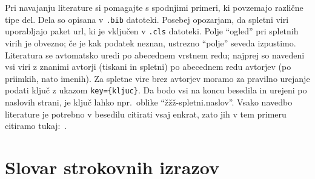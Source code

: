\documentclass[mat1]{fmfdelo}
\begin{document}
Pri navajanju literature si pomagajte s spodnjimi primeri, ki povzemajo različne tipe del. Dela so opisana v \verb|.bib| datoteki.
Posebej opozarjam, da spletni viri uporabljajo paket url, ki je vključen v \verb|.cls| datoteki. Polje ``ogled'' pri spletnih virih je obvezno; če je kak podatek neznan, ustrezno ``polje'' seveda izpustimo. Literatura se avtomatsko uredi po abecednem vrstnem redu; najprej so navedeni vsi viri z znanimi avtorji (tiskani in spletni)  po abecednem redu avtorjev (po priimkih, nato imenih). Za spletne vire brez avtorjev moramo za pravilno urejanje podati ključ z ukazom \verb|key={kljuc}|. Da bodo vsi na koncu besedila in urejeni po naslovih strani, je ključ lahko npr.~oblike ``žžž-spletni.naslov''.
Vsako navedbo literature je potrebno v besedilu citirati vsaj enkrat, zato jih v tem primeru citiramo tukaj:~\cite{angelini2011straight,globevniSkriptaWeb,lang2012fundamentals,lindic2007igra,spletMatrika,penttila2005flocks,spletSample,diplomaSample,conferenceSample,bookSample,clanekSample,velkovrh1974nekaj}.


\section*{Slovar strokovnih izrazov}









\end{document}
